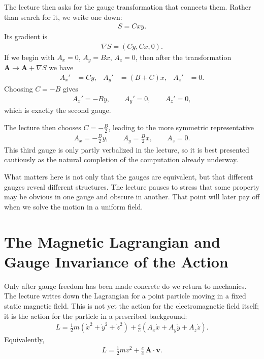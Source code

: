 The lecture then asks for the gauge transformation that connects them. Rather than search for it, we write one down:
\begin{align}
S=Cxy.
\end{align}
Its gradient is
\begin{align}
\nabla S=(Cy,Cx,0).
\end{align}
If we begin with \(A_x=0\), \(A_y=Bx\), \(A_z=0\), then after the transformation \(\mathbf A\to\mathbf A+\nabla S\) we have
\begin{align}
A_x'&=Cy, &
A_y'&=(B+C)x, &
A_z'&=0.
\end{align}
Choosing \(C=-B\) gives
\begin{align}
A_x'=-By,\qquad A_y'=0,\qquad A_z'=0,
\end{align}
which is exactly the second gauge.

The lecture then chooses \(C=-\frac{B}{2}\), leading to the more symmetric representative
\begin{align}
A_x=-\frac{B}{2}y,\qquad A_y=\frac{B}{2}x,\qquad A_z=0.
\end{align}
This third gauge is only partly verbalized in the lecture, so it is best presented cautiously as the natural completion of the computation already underway.

What matters here is not only that the gauges are equivalent, but that different gauges reveal different structures. The lecture pauses to stress that some property may be obvious in one gauge and obscure in another. That point will later pay off when we solve the motion in a uniform field.

\section{The Magnetic Lagrangian and Gauge Invariance of the Action}

Only after gauge freedom has been made concrete do we return to mechanics. The lecture writes down the Lagrangian for a point particle moving in a fixed static magnetic field. This is not yet the action for the electromagnetic field itself; it is the action for the particle in a prescribed background:
\begin{align}
L
=
\frac{1}{2}m\left(\dot x^2+\dot y^2+\dot z^2\right)
+\frac{e}{c}\left(A_x\dot x+A_y\dot y+A_z\dot z\right).
\end{align}
Equivalently,
\begin{align}
L=\frac{1}{2}mv^2+\frac{e}{c}\,\mathbf A\cdot \mathbf v.
\end{align}

